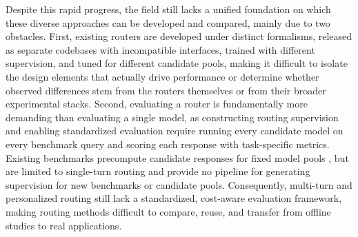 Despite this rapid progress, the field still lacks a unified foundation on which these diverse approaches can be developed and compared, mainly due to two obstacles.
First, existing routers are developed under distinct formalisms, released as separate codebases with incompatible interfaces, trained with different supervision, and tuned for different candidate pools, making it difficult to isolate the design elements that actually drive performance or determine whether observed differences stem from the routers themselves or from their broader experimental stacks.
Second, evaluating a router is fundamentally more demanding than evaluating a single model, as constructing routing supervision and enabling standardized evaluation require running every candidate model on every benchmark query and scoring each response with task-specific metrics. Existing benchmarks precompute candidate responses for fixed model pools \citep{hu2024routerbench, huang2025routereval}, but are limited to single-turn routing and provide no pipeline for generating supervision for new benchmarks or candidate pools. Consequently, multi-turn and personalized routing still lack a standardized, cost-aware evaluation framework, making routing methods difficult to compare, reuse, and transfer from offline studies to real applications.

